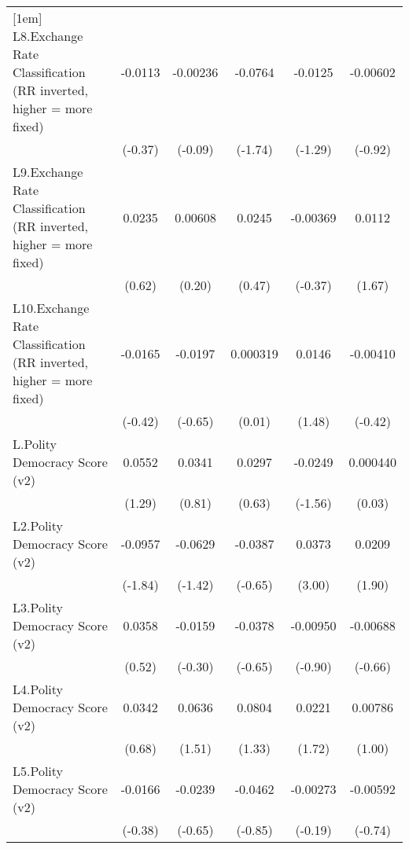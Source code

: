 {\begin{tabular}{l*{5}{c}}
[1em]
L8.Exchange Rate Classification (RR inverted, higher = more fixed)&  -0.0113         & -0.00236         &  -0.0764         &  -0.0125         & -0.00602         \\
                &  (-0.37)         &  (-0.09)         &  (-1.74)         &  (-1.29)         &  (-0.92)         \\
[1em]
L9.Exchange Rate Classification (RR inverted, higher = more fixed)&   0.0235         &  0.00608         &   0.0245         & -0.00369         &   0.0112         \\
                &   (0.62)         &   (0.20)         &   (0.47)         &  (-0.37)         &   (1.67)         \\
[1em]
L10.Exchange Rate Classification (RR inverted, higher = more fixed)&  -0.0165         &  -0.0197         & 0.000319         &   0.0146         & -0.00410         \\
                &  (-0.42)         &  (-0.65)         &   (0.01)         &   (1.48)         &  (-0.42)         \\
[1em]
L.Polity Democracy Score (v2)&   0.0552         &   0.0341         &   0.0297         &  -0.0249         & 0.000440         \\
                &   (1.29)         &   (0.81)         &   (0.63)         &  (-1.56)         &   (0.03)         \\
[1em]
L2.Polity Democracy Score (v2)&  -0.0957         &  -0.0629         &  -0.0387         &   0.0373\sym{**} &   0.0209         \\
                &  (-1.84)         &  (-1.42)         &  (-0.65)         &   (3.00)         &   (1.90)         \\
[1em]
L3.Polity Democracy Score (v2)&   0.0358         &  -0.0159         &  -0.0378         & -0.00950         & -0.00688         \\
                &   (0.52)         &  (-0.30)         &  (-0.65)         &  (-0.90)         &  (-0.66)         \\
[1em]
L4.Polity Democracy Score (v2)&   0.0342         &   0.0636         &   0.0804         &   0.0221         &  0.00786         \\
                &   (0.68)         &   (1.51)         &   (1.33)         &   (1.72)         &   (1.00)         \\
[1em]
L5.Polity Democracy Score (v2)&  -0.0166         &  -0.0239         &  -0.0462         & -0.00273         & -0.00592         \\
                &  (-0.38)         &  (-0.65)         &  (-0.85)         &  (-0.19)         &  (-0.74)         \\

\end{tabular}}
